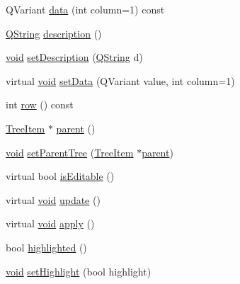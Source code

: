 \begin{DoxyCompactItemize}
\-Q\-Variant \hyperlink{group___u_a_v_object_browser_plugin_ga7c5708ae3cbba9c509f497c493beccb6}{data} (int column=1) const 
\item 
\hyperlink{group___u_a_v_objects_plugin_gab9d252f49c333c94a72f97ce3105a32d}{\-Q\-String} \hyperlink{group___u_a_v_object_browser_plugin_gadb051f76eb10bd51ba2b7830601f0046}{description} ()
\item 
\hyperlink{group___u_a_v_objects_plugin_ga444cf2ff3f0ecbe028adce838d373f5c}{void} \hyperlink{group___u_a_v_object_browser_plugin_ga14cc339bd1ed2fc44cb352461c623031}{set\-Description} (\hyperlink{group___u_a_v_objects_plugin_gab9d252f49c333c94a72f97ce3105a32d}{\-Q\-String} d)
\item 
virtual \hyperlink{group___u_a_v_objects_plugin_ga444cf2ff3f0ecbe028adce838d373f5c}{void} \hyperlink{group___u_a_v_object_browser_plugin_gac71bc85379e761548f4a7d15f049cdd8}{set\-Data} (\-Q\-Variant value, int column=1)
\item 
int \hyperlink{group___u_a_v_object_browser_plugin_ga5a062d24b35421360ad1d101c564e9be}{row} () const 
\item 
\hyperlink{class_tree_item}{\-Tree\-Item} $\ast$ \hyperlink{group___u_a_v_object_browser_plugin_gaa3a7ba624312b6be70872634db291881}{parent} ()
\item 
\hyperlink{group___u_a_v_objects_plugin_ga444cf2ff3f0ecbe028adce838d373f5c}{void} \hyperlink{group___u_a_v_object_browser_plugin_gab0eb64f28a5cd5d9e77ff4579014b1bb}{set\-Parent\-Tree} (\hyperlink{class_tree_item}{\-Tree\-Item} $\ast$\hyperlink{group___u_a_v_object_browser_plugin_gaa3a7ba624312b6be70872634db291881}{parent})
\item 
virtual bool \hyperlink{group___u_a_v_object_browser_plugin_ga6d83a2fdf1599b2be263c94ad5b05e83}{is\-Editable} ()
\item 
virtual \hyperlink{group___u_a_v_objects_plugin_ga444cf2ff3f0ecbe028adce838d373f5c}{void} \hyperlink{group___u_a_v_object_browser_plugin_gab6c763d5ea39c359ab56b4d8b1af8f7b}{update} ()
\item 
virtual \hyperlink{group___u_a_v_objects_plugin_ga444cf2ff3f0ecbe028adce838d373f5c}{void} \hyperlink{group___u_a_v_object_browser_plugin_gaca25a01ba924019208f39d7c7ae2f593}{apply} ()
\item 
bool \hyperlink{group___u_a_v_object_browser_plugin_ga47c7c59b2ed66695e9c42351fbeb24b2}{highlighted} ()
\item 
\hyperlink{group___u_a_v_objects_plugin_ga444cf2ff3f0ecbe028adce838d373f5c}{void} \hyperlink{group___u_a_v_object_browser_plugin_ga59e306591cb8099a247f47cde3e4e78a}{set\-Highlight} (bool highlight)

\end{DoxyCompactItemize}
